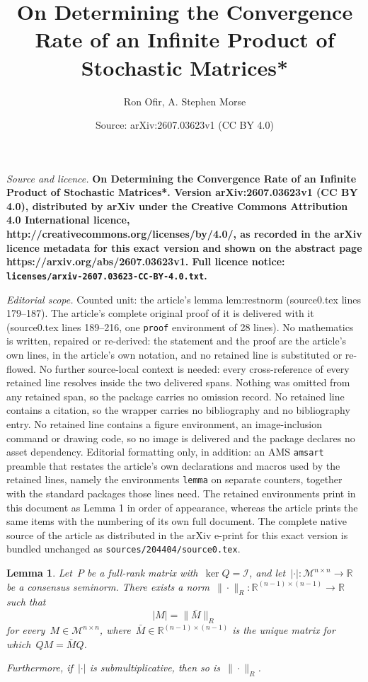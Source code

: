 \documentclass[10pt,a4paper]{amsart}
\title{\LARGE \bf On Determining the Convergence Rate of an Infinite Product of Stochastic Matrices*}
\author{Ron Ofir, A. Stephen Morse}
\date{Source: arXiv:2607.03623v1 (CC BY 4.0)}
\newtheorem{lemma}{Lemma}
\newcommand{\R}{\mathbb R}
\newcommand{\consubsp}{\mathcal{I}} %
\newcommand{\eqrowsum}{\mathcal{M}} %
\newcommand{\gensn}[1]{|#1|} %
\newcommand{\restnorm}[1]{\|#1\|_R} %
\begin{document}
\maketitle

\noindent\emph{Source and licence.} \LARGE \bf On Determining the Convergence Rate of an Infinite Product of Stochastic Matrices*. Version arXiv:2607.03623v1 (CC BY 4.0), distributed by arXiv under the Creative Commons Attribution 4.0 International licence, http://creativecommons.org/licenses/by/4.0/, as recorded in the arXiv licence metadata for this exact version and shown on the abstract page https://arxiv.org/abs/2607.03623v1. Full licence notice: \texttt{licenses/arxiv-2607.03623-CC-BY-4.0.txt}.\par\smallskip

\noindent\textit{Editorial scope.} Counted unit: the article's lemma lem:restnorm (source0.tex lines 179--187). The article's complete original proof of it is delivered with it (source0.tex lines 189--216, one \texttt{proof} environment of 28 lines). No mathematics is written, repaired or re-derived: the statement and the proof are the article's own lines, in the article's own notation, and no retained line is substituted or re-flowed.  No further source-local context is needed: every cross-reference of every retained line resolves inside the two delivered spans.  Nothing was omitted from any retained span, so the package carries no omission record.  No retained line contains a citation, so the wrapper carries no bibliography and no bibliography entry.  No retained line contains a figure environment, an image-inclusion command or drawing code, so no image is delivered and the package declares no asset dependency.  Editorial formatting only, in addition: an AMS \texttt{amsart} preamble that restates the article's own declarations and macros used by the retained lines, namely the environments \texttt{lemma} on separate counters, together with the standard packages those lines need.  The retained environments print in this document as Lemma 1 in order of appearance, whereas the article prints the same items with the numbering of its own full document.  The complete native source of the article as distributed in the arXiv e-print for this exact version is bundled unchanged as \texttt{sources/204404/source0.tex}.
\begin{lemma}\label{lem:restnorm}
    Let~$P$ be a full-rank matrix with~$\ker Q = \consubsp$, and let~$\gensn{\cdot} : \eqrowsum^{n \times n} \to \R$ be a consensus seminorm. There exists a norm~$\restnorm{\cdot} : \R^{(n-1) \times (n-1)} \to \R$ such that
    \begin{equation}
        \gensn{M} = \restnorm{\bar M}
    \end{equation}
    for every~$M \in \eqrowsum^{n \times n}$, where~$\bar M \in \R^{(n-1) \times (n-1)}$ is the unique matrix for which~$QM = \bar M Q$.

    Furthermore, if~$\gensn{\cdot}$ is submultiplicative, then so is~$\restnorm{\cdot}$.
\end{lemma}
\end{document}
